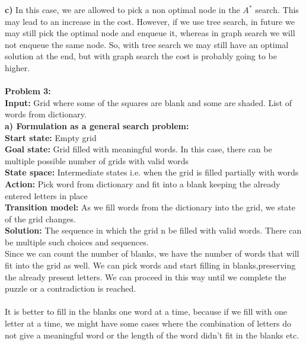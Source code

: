 {\bf c)} In this case, we are allowed to pick a non optimal node in the $A^*$ search. This may lead to an increase in the cost. However, if we use tree search, in future we may still pick the optimal node and enqueue it, whereas in graph search we will not enqueue the same node. So, with tree search we may still have an optimal solution at the end, but with graph search the cost is probably going to be higher. \\ \\

{\bf Problem 3:}\\
{\bf Input:} Grid where some of the squares are blank and some are shaded. List of words from dictionary.\\
{\bf a) Formulation as a general search problem:}\\
{\bf Start state:} Empty grid\\
{\bf Goal state:} Grid filled with meaningful words. In this case, there can be multiple possible number of grids with valid words\\
{\bf State space:} Intermediate states i.e. when the grid is filled partially with words\\
{\bf Action:} Pick word from dictionary and fit into a blank keeping the already entered letters in place\\
{\bf Transition model:} As we fill words from the dictionary into the grid, we state of the grid changes.\\
{\bf Solution:} The sequence in which the grid n be filled with valid words. There can be multiple such choices and sequences.\\
Since we can count the number of blanks, we have the number of words that will fit into the grid as well. We can pick words and start filling in blanks,preserving the already present letters. We can proceed in this way until we complete the puzzle or a contradiction is reached.\\ \\

It is better to fill in the blanks one word at a time, because if we fill with one letter at a time, we might have some cases where the combination of letters do not give a meaningful word or the length of the word didn't fit in the blanks etc.\\ \\

